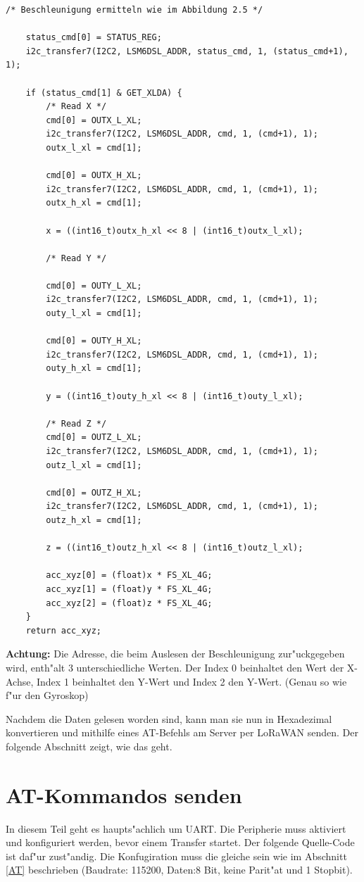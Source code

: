 \begin{lstlisting}[frame=single]
	/* Beschleunigung ermitteln wie im Abbildung 2.5 */
	
	status_cmd[0] = STATUS_REG;
	i2c_transfer7(I2C2, LSM6DSL_ADDR, status_cmd, 1, (status_cmd+1), 1);
	
	if (status_cmd[1] & GET_XLDA) {
		/* Read X */
		cmd[0] = OUTX_L_XL;
		i2c_transfer7(I2C2, LSM6DSL_ADDR, cmd, 1, (cmd+1), 1);
		outx_l_xl = cmd[1];
	
		cmd[0] = OUTX_H_XL;
		i2c_transfer7(I2C2, LSM6DSL_ADDR, cmd, 1, (cmd+1), 1);
		outx_h_xl = cmd[1];
	
		x = ((int16_t)outx_h_xl << 8 | (int16_t)outx_l_xl);
	
		/* Read Y */
	
		cmd[0] = OUTY_L_XL;
		i2c_transfer7(I2C2, LSM6DSL_ADDR, cmd, 1, (cmd+1), 1);
		outy_l_xl = cmd[1];
	
		cmd[0] = OUTY_H_XL;
		i2c_transfer7(I2C2, LSM6DSL_ADDR, cmd, 1, (cmd+1), 1);
		outy_h_xl = cmd[1];
	
		y = ((int16_t)outy_h_xl << 8 | (int16_t)outy_l_xl);
	
		/* Read Z */
		cmd[0] = OUTZ_L_XL;
		i2c_transfer7(I2C2, LSM6DSL_ADDR, cmd, 1, (cmd+1), 1);
		outz_l_xl = cmd[1];
	
		cmd[0] = OUTZ_H_XL;
		i2c_transfer7(I2C2, LSM6DSL_ADDR, cmd, 1, (cmd+1), 1);
		outz_h_xl = cmd[1];
	
		z = ((int16_t)outz_h_xl << 8 | (int16_t)outz_l_xl);
	
		acc_xyz[0] = (float)x * FS_XL_4G;
		acc_xyz[1] = (float)y * FS_XL_4G;
		acc_xyz[2] = (float)z * FS_XL_4G;
	}
	return acc_xyz;
\end{lstlisting}

\textbf{Achtung:} Die Adresse, die beim Auslesen der Beschleunigung
zur"uckgegeben wird, enth"alt 3 unterschiedliche Werten. Der Index 0 
beinhaltet den Wert der X-Achse, Index 1 beinhaltet den Y-Wert und 
Index 2 den Y-Wert. (Genau so wie f"ur den Gyroskop)

Nachdem die Daten gelesen worden sind, kann man sie nun in Hexadezimal 
konvertieren und mithilfe eines AT-Befehls am Server per LoRaWAN 
senden. Der folgende Abschnitt zeigt, wie das geht.


\section{AT-Kommandos senden}
In diesem Teil geht es haupts"achlich um UART. Die Peripherie muss 
aktiviert und konfiguriert werden, bevor einem Transfer startet. Der 
folgende Quelle-Code ist daf"ur zust"andig.
Die Konfugiration muss die gleiche sein wie im Abschnitt \ref{AT} 
beschrieben (Baudrate: 115200, Daten:8 Bit, keine Parit"at und 1 
Stopbit).

